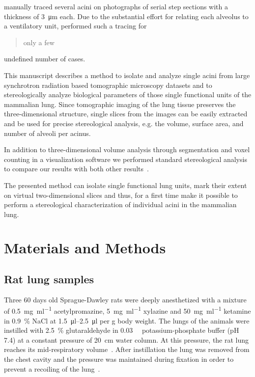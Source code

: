 \documentclass[draft,a4paper,DIVcalc,abstract,english]{scrartcl}
\begin{document}
\citet{Mercer1987a} manually traced several acini on photographs of serial step sections with a thickness of \SI{3}{\micro\meter} each.
Due to the substantial effort for relating each alveolus to a ventilatory unit, \citeauthor{Mercer1987a} performed such a tracing for \blockquote{only a few} undefined number of cases.

This manuscript describes a method to isolate and analyze single acini from large synchrotron radiation based tomographic microscopy datasets and to stereologically analyze biological parameters of those single functional units of the mammalian lung.
Since tomographic imaging of the lung tissue preserves the three-dimensional structure, single slices from the images can be easily extracted and be used for precise stereological analysis, e.g. the volume, surface area, and number of alveoli per acinus.

In addition to three-dimensional volume analysis through segmentation and voxel counting in a visualization software we performed standard stereological analysis~\citep{Hsia2010} to compare our results with both other results~\citep{Rodriguez1987,Tschanz2003,Mercer1987a}.

The presented method can isolate single functional lung units, mark their extent on virtual two-dimensional slices and thus, for a first time make it possible to perform a stereological characterization of individual acini in the mammalian lung.

\section{Materials and Methods}
\label{sec:materials and methods}
\subsection{Rat lung samples}
Three 60 days old Sprague-Dawley rats were deeply anesthetized with a mixture of %
\SI{0.5}{\milli\gram\per\milli\litre} acetylpromazine, %
\SI{5}{\milli\gram\per\milli\litre} xylazine and %
\SI{50}{\milli\gram\per\milli\litre} ketamine in %
\SI{0.9}{\percent} NaCl at \SIrange{1.5}{2.5}{\micro\litre} per \si{\gram} body weight.
The lungs of the animals were instilled with \SI{2.5}{\percent} glutaraldehyde in \SI{0.03}{\milli\Molar} potassium-phosphate buffer (pH 7.4) at a constant pressure of \SI{20}{\centi\meter} water column.
At this pressure, the rat lung reaches its mid-respiratory volume~\citep{Schittny1998}.
After instillation the lung was removed from the chest cavity and the pressure was maintained during fixation in order to prevent a recoiling of the lung~\citep{Mund2008}.
\end{document}
